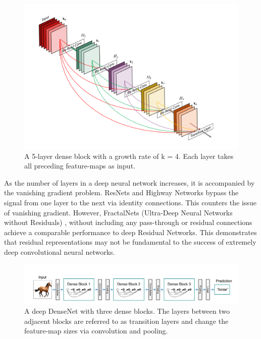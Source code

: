 \documentclass[11pt,twocolumn,letterpaper]{article}
\begin{document}
\begin{figure}
	\begin{center}
		\includegraphics[width=0.8\linewidth]{image1.png}
	\end{center}
	\caption{A 5-layer dense block with a growth rate of k = 4.
		Each layer takes all preceding feature-maps as input.}
	\label{fig: image1.png}
\end{figure}

As the number of layers  in a deep neural network increases, it is accompanied by the vanishing gradient problem. ResNets \cite{DBLP:journals/corr/HeZRS15} and Highway Networks \cite{NIPS2015_5850} bypass the signal from one layer to the next via identity connections. This counters the issue of vanishing gradient. However, FractalNets (Ultra-Deep Neural Networks without Residuals) \cite{DBLP:journals/corr/LarssonMS16a}, without including any pass-through or residual connections achieve a comparable performance to deep Residual Networks. This demonstrates that residual representations may not be fundamental to the success of extremely deep convolutional neural networks.

\begin{figure}
	\begin{center}
		\includegraphics[width=\linewidth]{image_large.png}
	\end{center}
	\caption{A deep DenseNet with three dense blocks. The layers between two adjacent blocks are referred to as transition layers and change the feature-map sizes via convolution and pooling.}
	\label{fig: image_large.png}
\end{figure}
\end{document}
